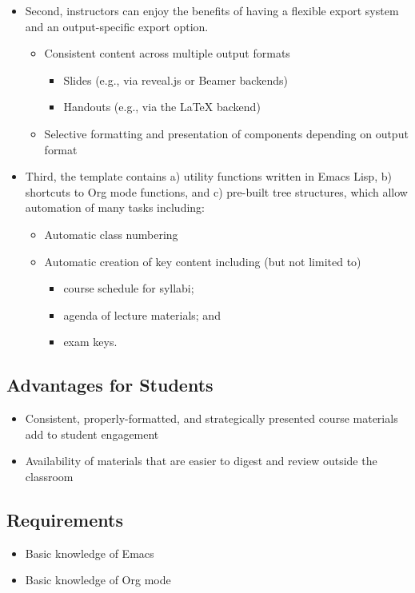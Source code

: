 \documentclass[10pt,article]{article}
\begin{document}
\begin{itemize}
\item Second, instructors can enjoy the benefits of having a flexible export system and an output-specific export option.
\begin{itemize}
\item Consistent content across multiple output formats
\begin{itemize}
\item Slides (e.g., via reveal.js or Beamer backends)
\item Handouts (e.g., via the \LaTeX{} backend)
\end{itemize}
\item Selective formatting and presentation of components depending on output
format
\end{itemize}
\item Third, the template contains a) utility functions written in Emacs Lisp, b)
shortcuts to Org mode functions, and c) pre-built tree structures, which
allow automation of many tasks including:
\begin{itemize}
\item Automatic class numbering
\item Automatic creation of key content including (but not limited to)
\begin{itemize}
\item course schedule for syllabi;
\item agenda of lecture materials; and
\item exam keys.
\end{itemize}
\end{itemize}
\end{itemize}
\subsection{Advantages for Students}
\label{sec:org124592f}
\begin{itemize}
\item Consistent, properly-formatted, and strategically presented course materials add to student engagement
\item Availability of materials that are easier to digest and review outside the classroom
\end{itemize}
\subsection{Requirements}
\label{sec:org54133ce}
\begin{itemize}
\item Basic knowledge of Emacs
\item Basic knowledge of Org mode
\end{itemize}
\end{document}
